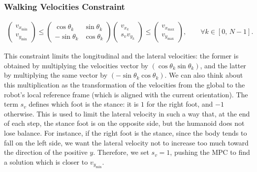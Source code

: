 \subsubsection{Walking Velocities Constraint}
\begin{align}
    \begin{pmatrix}
        v_{x_{\min}} \\[1ex]
        v_{y_{\min}}
    \end{pmatrix}
    \le
    \begin{pmatrix}
        \cos\theta_{k} & \sin\theta_{k} \\[1ex]
        -\sin\theta_{k} & \cos\theta_{k}
    \end{pmatrix}
    \begin{pmatrix}
        v_{x_{k}} \\[1ex]
        s_{v} v_{y_{k}}
    \end{pmatrix}
    \le
    \begin{pmatrix}
        v_{x_{\max}} \\[1ex]
        v_{y_{\max}}
    \end{pmatrix}
    , \qquad \forall k \in \left[ 0,\, N-1\right].
\end{align}

This constraint limits the longitudinal and the lateral velocities: the former is obtained by multiplying the velocities vector by $\left(\cos{\theta_k} \sin{\theta_k}\right)$, and the latter by multiplying the same vector by $\left(-\sin{\theta_k} \cos{\theta_k}\right)$.
We can also think about this multiplication as the transformation of the velocities from the global to the robot's local reference frame (which is aligned with the current orientation).
The term $s_v$ defines which foot is the stance: it is $1$ for the right foot, and $-1$ otherwise. This is used to limit the lateral velocity in such a way that, at the end of each step, the stance foot is on the opposite side, but the humanoid does not lose balance.
For instance, if the right foot is the stance, since the body tends to fall on the left side, we want the lateral velocity not to increase too much toward the direction of the positive $y$. Therefore, we set $s_v=1$, pushing the MPC to find a solution which is closer to $v_{y_{\min}}$.

